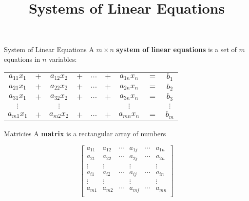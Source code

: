 \documentclass{beamer}
\title[MATH 1050 - Section 8.2]{Systems of Linear Equations}
\begin{document}
\begin{frame}
  \titlepage
\end{frame}

\begin{frame}
\begin{block}{System of Linear Equations}
A $m\times n$ \textbf{system of linear equations} is a set of $m$ equations in $n$ variables:

\vspace{-3mm}
\begin{center}
\begin{tabular}{ccccccccc}
$a_{11}x_1$&$+$&$a_{12}x_2$&$+$&$\dots$&$+$&$a_{1n}x_n$&$=$&$b_1$\\
$a_{21}x_1$&$+$&$a_{22}x_2$&$+$&$\dots$&$+$&$a_{2n}x_n$&$=$&$b_2$\\
$a_{31}x_1$&$+$&$a_{32}x_2$&$+$&$\dots$&$+$&$a_{3n}x_n$&$=$&$b_3$\\
$\vdots$&&$\vdots$&&&&$\vdots$&&$\vdots$\\
$a_{m1}x_1$&$+$&$a_{m2}x_2$&$+$&$\dots$&$+$&$a_{mn}x_n$&$=$&$b_m$\\
\end{tabular}
\end{center}
\end{block}\pause
\begin{block}{Matricies}
A \textbf{matrix} is a rectangular array of numbers

\vspace{-2mm}
\begin{equation*}
\begin{bmatrix}
a_{11} & a_{12} & \cdots & a_{1j} & \cdots & a_{1n} \\
a_{21} & a_{22} & \cdots & a_{2j} & \cdots & a_{2n} \\
\vdots & \vdots &        & \vdots &        & \vdots \\
a_{i1} & a_{i2} & \cdots & a_{ij} & \cdots & a_{in} \\
\vdots & \vdots &        & \vdots &        & \vdots \\
a_{m1} & a_{m2} & \cdots & a_{mj} & \cdots & a_{mn} \\
\end{bmatrix}
\end{equation*}
\end{block}
\end{frame}
\end{document}
